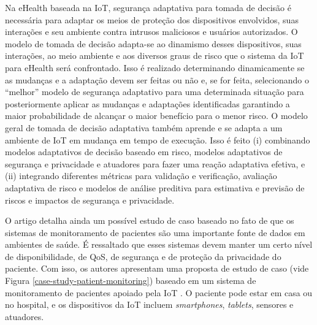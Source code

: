 \documentclass[tid,table]{texufpel} %
\begin{document}
Na eHealth baseada na IoT, segurança adaptativa para tomada de decisão é necessária para adaptar os meios de proteção dos dispositivos envolvidos, suas interações e seu ambiente contra intrusos maliciosos e usuários autorizados. O modelo de tomada de decisão adapta-se ao dinamismo desses dispositivos, suas interações, ao meio ambiente e aos diversos graus de risco que o sistema da IoT para eHealth será confrontado. Isso é realizado determinando dinamicamente se as mudanças e a adaptação devem ser feitas ou não e, se for feita, selecionando o ``melhor'' modelo de segurança adaptativo para uma determinada situação para posteriormente aplicar as mudanças e adaptações identificadas garantindo a maior probabilidade de alcançar o maior benefício para o menor risco. O modelo geral de tomada de decisão adaptativa também aprende e se adapta a um ambiente de IoT em mudança em tempo de execução. Isso é feito (i) combinando modelos adaptativos de decisão baseado em risco, modelos adaptativos de segurança e privacidade e atuadores para fazer uma reação adaptativa efetiva, e (ii) integrando diferentes métricas para validação e verificação, avaliação adaptativa de risco e modelos de análise preditiva para estimativa e previsão de riscos e impactos de segurança e privacidade.




O artigo detalha ainda um possível estudo de caso baseado no fato de que os sistemas de monitoramento de pacientes são uma importante fonte de dados em ambientes de saúde. É ressaltado que esses sistemas devem manter um certo nível de disponibilidade, de QoS, de segurança e de proteção da privacidade do paciente. Com isso, os autores apresentam uma proposta de estudo de caso (vide Figura \ref{case-study-patient-monitoring}) baseado em um sistema de monitoramento de pacientes apoiado pela IoT . O paciente pode estar em casa ou no hospital, e os dispositivos da IoT incluem \textit{smartphones}, \textit{tablets}, sensores e atuadores.
\end{document}
